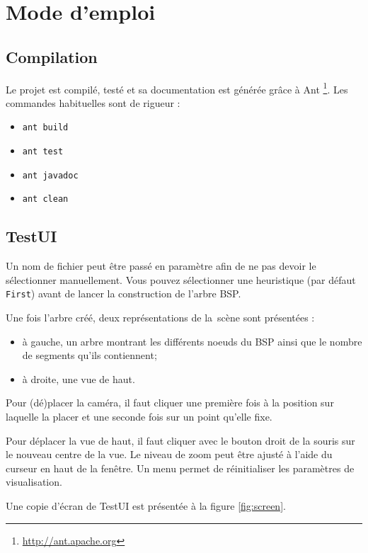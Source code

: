 \documentclass[12pt,twocolumn]{article}
\begin{document}
\section{Mode d'emploi}
\subsection{Compilation}
Le projet est compilé, testé et sa documentation est générée grâce à Ant
\footnote{\url{http://ant.apache.org}}.
Les commandes habituelles sont de rigueur :
\begin{itemize}
	\item \texttt{ant build}
	\item \texttt{ant test}
	\item \texttt{ant javadoc}
	\item \texttt{ant clean}
\end{itemize}


\subsection{TestUI}
Un nom de fichier peut être passé en paramètre afin de ne pas devoir le
sélectionner manuellement. Vous pouvez sélectionner une heuristique
(par défaut \texttt{First}) avant de lancer la construction de l'arbre BSP.

Une fois l'arbre créé, deux représentations de la~scène sont présentées :
\begin{itemize}
\item à gauche, un arbre montrant les différents noeuds du BSP ainsi
	que le nombre de segments qu'ils contiennent;
\item à droite, une vue de haut.
\end{itemize}

Pour (dé)placer la caméra, il faut cliquer une première fois à la position sur
laquelle la placer et une seconde fois sur un point qu'elle fixe.

Pour déplacer la vue de haut, il faut cliquer avec le bouton droit de la souris
sur le nouveau centre de la vue. Le niveau de zoom peut être ajusté à l'aide du
curseur en haut de la fenêtre. Un menu permet de réinitialiser
les paramètres de visualisation.

Une copie d'écran de TestUI est présentée à la figure \ref{fig:screen}.
\end{document}
